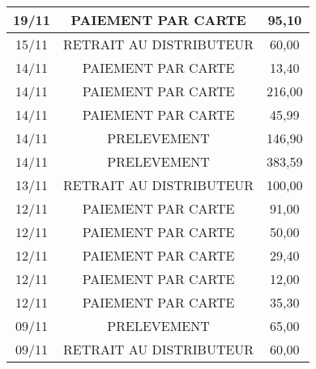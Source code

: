 \begin{longtable}{|c|c|c|}
19/11 & PAIEMENT PAR CARTE & 95,10 \\
\hline
15/11 & RETRAIT AU DISTRIBUTEUR & 60,00 \\
\hline
14/11 & PAIEMENT PAR CARTE & 13,40 \\
\hline
14/11 & PAIEMENT PAR CARTE & 216,00 \\
\hline
14/11 & PAIEMENT PAR CARTE & 45,99 \\
\hline
14/11 & PRELEVEMENT & 146,90 \\
\hline
14/11 & PRELEVEMENT & 383,59 \\
\hline
13/11 & RETRAIT AU DISTRIBUTEUR & 100,00 \\
\hline
12/11 & PAIEMENT PAR CARTE & 91,00 \\
\hline
12/11 & PAIEMENT PAR CARTE & 50,00 \\
\hline
12/11 & PAIEMENT PAR CARTE & 29,40 \\
\hline
12/11 & PAIEMENT PAR CARTE & 12,00 \\
\hline
12/11 & PAIEMENT PAR CARTE & 35,30 \\
\hline
09/11 & PRELEVEMENT & 65,00 \\
\hline
09/11 & RETRAIT AU DISTRIBUTEUR & 60,00 \\
\hline
\end{longtable}
